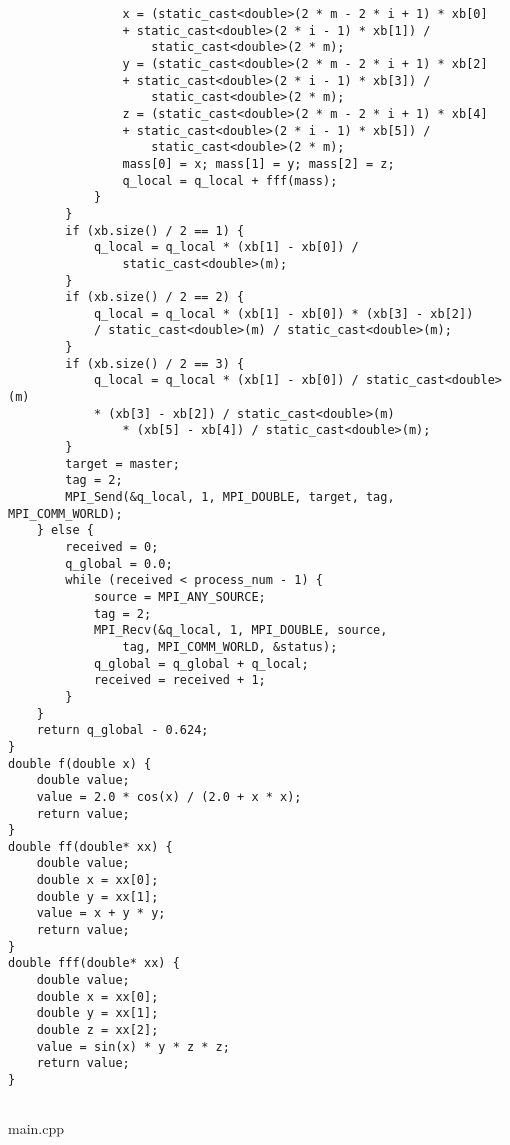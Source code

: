 \documentclass{report}
\begin{document}
\begin{lstlisting}
                x = (static_cast<double>(2 * m - 2 * i + 1) * xb[0]
                + static_cast<double>(2 * i - 1) * xb[1]) /
                    static_cast<double>(2 * m);
                y = (static_cast<double>(2 * m - 2 * i + 1) * xb[2]
                + static_cast<double>(2 * i - 1) * xb[3]) /
                    static_cast<double>(2 * m);
                z = (static_cast<double>(2 * m - 2 * i + 1) * xb[4]
                + static_cast<double>(2 * i - 1) * xb[5]) /
                    static_cast<double>(2 * m);
                mass[0] = x; mass[1] = y; mass[2] = z;
                q_local = q_local + fff(mass);
            }
        }
        if (xb.size() / 2 == 1) {
            q_local = q_local * (xb[1] - xb[0]) /
                static_cast<double>(m);
        }
        if (xb.size() / 2 == 2) {
            q_local = q_local * (xb[1] - xb[0]) * (xb[3] - xb[2])
            / static_cast<double>(m) / static_cast<double>(m);
        }
        if (xb.size() / 2 == 3) {
            q_local = q_local * (xb[1] - xb[0]) / static_cast<double>(m)
            * (xb[3] - xb[2]) / static_cast<double>(m)
                * (xb[5] - xb[4]) / static_cast<double>(m);
        }
        target = master;
        tag = 2;
        MPI_Send(&q_local, 1, MPI_DOUBLE, target, tag, MPI_COMM_WORLD);
    } else {
        received = 0;
        q_global = 0.0;
        while (received < process_num - 1) {
            source = MPI_ANY_SOURCE;
            tag = 2;
            MPI_Recv(&q_local, 1, MPI_DOUBLE, source,
                tag, MPI_COMM_WORLD, &status);
            q_global = q_global + q_local;
            received = received + 1;
        }
    }
    return q_global - 0.624;
}
double f(double x) {
    double value;
    value = 2.0 * cos(x) / (2.0 + x * x);
    return value;
}
double ff(double* xx) {
    double value;
    double x = xx[0];
    double y = xx[1];
    value = x + y * y;
    return value;
}
double fff(double* xx) {
    double value;
    double x = xx[0];
    double y = xx[1];
    double z = xx[2];
    value = sin(x) * y * z * z;
    return value;
}


\end{lstlisting}
main.cpp
\end{document}
